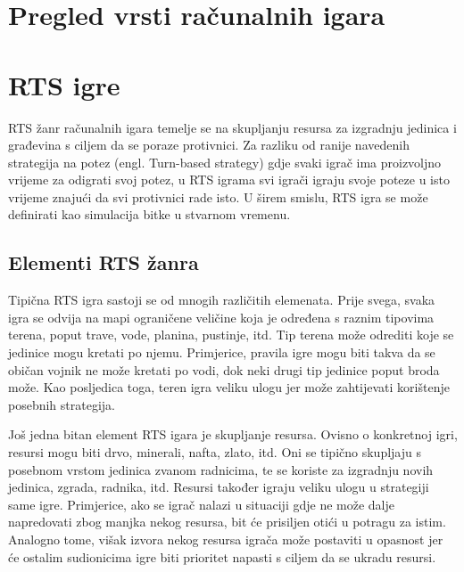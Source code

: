 \documentclass[times, utf8, zavrsni, numeric]{fer}
\begin{document}

\chapter{Pregled vrsti računalnih igara}\label{ch:games}

\chapter{RTS igre}\label{ch:rtsGames}
RTS žanr računalnih igara temelje se na skupljanju resursa za izgradnju jedinica i građevina s ciljem da se poraze protivnici. 
Za razliku od ranije navedenih strategija na potez (engl. Turn-based strategy) gdje svaki igrač ima proizvoljno vrijeme za odigrati svoj potez, u RTS igrama svi igrači igraju svoje poteze u isto vrijeme znajući da svi protivnici rade isto. 
U širem smislu, RTS igra se može definirati kao simulacija bitke u stvarnom vremenu\cite{url:WhatDoesRTSMean}.


\section{Elementi RTS žanra}

\par Tipična RTS igra sastoji se od mnogih različitih elemenata.
Prije svega, svaka igra se odvija na mapi ograničene veličine koja je određena s raznim tipovima terena, poput trave, vode, planina, pustinje, itd. 
Tip terena može odrediti koje se jedinice mogu kretati po njemu.
Primjerice, pravila igre mogu biti takva da se običan vojnik ne može kretati po vodi, dok neki drugi tip jedinice poput broda može.
Kao posljedica toga, teren igra veliku ulogu jer može zahtijevati korištenje posebnih strategija.

\par Još jedna bitan element RTS igara je skupljanje resursa.
Ovisno o konkretnoj igri, resursi mogu biti drvo, minerali, nafta, zlato, itd. Oni se tipično skupljaju s posebnom vrstom jedinica zvanom radnicima, te se koriste za izgradnju novih jedinica, zgrada, radnika, itd.
Resursi također igraju veliku ulogu u strategiji same igre.
Primjerice, ako se igrač nalazi u situaciji gdje ne može dalje napredovati zbog manjka nekog resursa, bit će prisiljen otići u potragu za istim.
Analogno tome, višak izvora nekog resursa igrača može postaviti u opasnost jer će ostalim sudionicima igre biti prioritet napasti s ciljem da se ukradu resursi.
\end{document}
